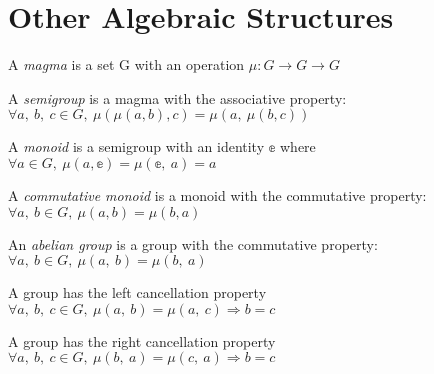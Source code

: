 \section{Other Algebraic Structures}

\begin{definition}[Magma]
    \label{definition : Magma}
    \leanok
    A \emph{magma} is a set G with an operation $\mu : G \rightarrow G \rightarrow G$
\end{definition}

\begin{definition}[Semigroup]
    \label{definition : Semigroup}
    \leanok
    A \emph{semigroup} is a magma with the associative property:
    $\forall a,~ b,~ c \in G, ~\mu(\mu(a, b), c) = \mu(a,~ \mu(b, c))$
\end{definition}

\begin{definition}[Monoid]
    \label{definition : Monoid}
    \leanok
    A \emph{monoid} is a semigroup with an identity $\mathbb{e}$ where
    $\forall a \in G, ~\mu (a, \mathbb{e}) = \mu(\mathbb{e},~ a) = a$
\end{definition}

\begin{definition}
    \label{definition : CommMonoid}
    \leanok
    A \emph{commutative monoid} is a monoid with the commutative property:
    $\forall a,~ b \in G, ~\mu(a, b) = \mu(b, a)$
\end{definition}

\begin{definition}
    \label{definition : AbelianGroup}
    \leanok
    An \emph{abelian group} is a group with the commutative property:
    $\forall a,~ b \in G, ~\mu(a,~ b) = \mu(b,~ a)$
\end{definition}

\begin{theorem}
    \label{definition : op_left_cancel}
    \leanok
    A group has the left cancellation property
    $\forall a,~ b,~ c \in G, ~\mu(a,~ b) = \mu(a,~ c) \Rightarrow b = c$
\end{theorem}

\begin{theorem}
    \label{definition : op_right_cancel}
    \leanok
    A group has the right cancellation property
    $\forall a, ~b, ~c \in G,~ \mu(b,~ a) = \mu(c,~ a) \Rightarrow b = c$
  \end{theorem}
